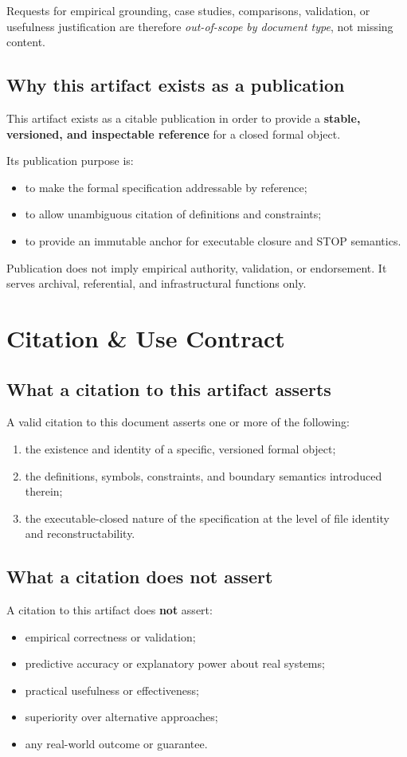 Requests for empirical grounding, case studies, comparisons, validation,
or usefulness justification are therefore \emph{out-of-scope by document
type}, not missing content.

\subsection{Why this artifact exists as a publication}
This artifact exists as a citable publication in order to provide a
\textbf{stable, versioned, and inspectable reference} for a closed formal
object.

Its publication purpose is:
\begin{itemize}
  \item to make the formal specification addressable by reference;
  \item to allow unambiguous citation of definitions and constraints;
  \item to provide an immutable anchor for executable closure and STOP semantics.
\end{itemize}

Publication does not imply empirical authority, validation, or endorsement.
It serves archival, referential, and infrastructural functions only.

\section{Citation \& Use Contract}
\label{sec:citation-contract}

\subsection{What a citation to this artifact asserts}
A valid citation to this document asserts one or more of the following:
\begin{enumerate}
  \item the existence and identity of a specific, versioned formal object;
  \item the definitions, symbols, constraints, and boundary semantics
        introduced therein;
  \item the executable-closed nature of the specification at the level of
        file identity and reconstructability.
\end{enumerate}

\subsection{What a citation does not assert}
A citation to this artifact does \textbf{not} assert:
\begin{itemize}
  \item empirical correctness or validation;
  \item predictive accuracy or explanatory power about real systems;
  \item practical usefulness or effectiveness;
  \item superiority over alternative approaches;
  \item any real-world outcome or guarantee.
\end{itemize}

